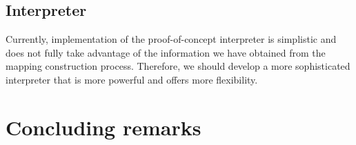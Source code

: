 \subsection{Interpreter}
Currently, implementation of the proof-of-concept interpreter is simplistic and does not fully take advantage of the information we have obtained from the mapping construction process. Therefore, we should develop a more sophisticated interpreter that is more powerful and offers more flexibility.

\section{Concluding remarks}
